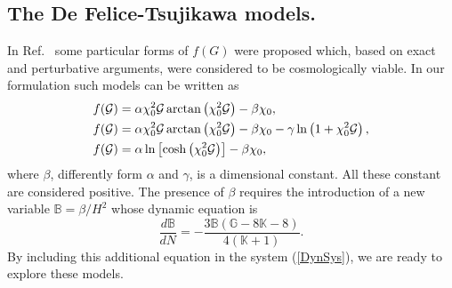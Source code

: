 \documentclass[a4paper,aps,onecolumn,nofootinbib]{revtex4}
\def\rf#1{(\ref{#1})}
\def\DerN#1{\frac{d #1}{d N}}
\def\G{{\cal G}}
\begin{document}
\subsection{The De Felice-Tsujikawa models.}
In Ref.~\cite{DeFelice:2008wz} some particular forms of $f(G)$ 
were proposed which,  based on exact and perturbative arguments, 
 were considered to  be cosmologically viable. In our formulation such models can be written as
\begin{equation}
\begin{split}
& f(\G)= \alpha \chi_0^2 \G \arctan\left(\chi_0^2 \G\right)-\beta \chi_0,\\
& f(\G)= \alpha \chi_0^2 \G \arctan\left(\chi_0^2 \G\right) -\beta \chi_0-\gamma \ln\left(1+\chi_0^2 \G\right),\\
& f(\G)= \alpha \ln\left[\cosh\left(\chi_0^2 \G\right)\right]-\beta \chi_0,
\end{split}
\end{equation}
where $\beta$, differently form $\alpha$ and $\gamma$, is a dimensional constant. All these constant are considered positive. The presence of $\beta$ requires the introduction of a new variable $\mathbb{B}= \beta/ H^2$ whose dynamic equation is
\begin{equation}
\DerN{\mathbb{B}}=-\frac{3 \mathbb{B} (\mathbb{G}-8 \mathbb{K}-8)}{4
   (\mathbb{K}+1)}.
\end{equation}
By including this additional equation in the system \rf{DynSys}, we are ready to explore these models.

\end{document}
